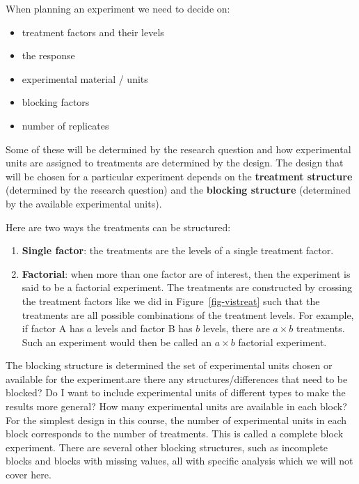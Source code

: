 \documentclass[
  letterpaper,
  DIV=11,
  numbers=noendperiod,
  oneside]{scrreprt}
\providecommand{\tightlist}{%
  \setlength{\itemsep}{0pt}\setlength{\parskip}{0pt}}\usepackage{longtable,booktabs,array}
\begin{document}
When planning an experiment we need to decide on:

\begin{itemize}
\tightlist
\item
  treatment factors and their levels
\item
  the response
\item
  experimental material / units
\item
  blocking factors
\item
  number of replicates
\end{itemize}

Some of these will be determined by the research question and how
experimental units are assigned to treatments are determined by the
design. The design that will be chosen for a particular experiment
depends on the \textbf{treatment structure} (determined by the research
question) and the \textbf{blocking structure} (determined by the
available experimental units).

Here are two ways the treatments can be structured:

\begin{enumerate}
\def\labelenumi{\arabic{enumi}.}
\tightlist
\item
  \textbf{Single factor}: the treatments are the levels of a single
  treatment factor.
\item
  \textbf{Factorial}: when more than one factor are of interest, then
  the experiment is said to be a factorial experiment. The treatments
  are constructed by crossing the treatment factors like we did in
  Figure~\ref{fig-vistreat} such that the treatments are all possible
  combinations of the treatment levels. For example, if factor A has
  \(a\) levels and factor B has \(b\) levels, there are \(a \times b\)
  treatments. Such an experiment would then be called an \(a \times b\)
  factorial experiment.
\end{enumerate}

The blocking structure is determined the set of experimental units
chosen or available for the experiment.are there any
structures/differences that need to be blocked? Do I want to include
experimental units of different types to make the results more general?
How many experimental units are available in each block? For the
simplest design in this course, the number of experimental units in each
block corresponds to the number of treatments. This is called a complete
block experiment. There are several other blocking structures, such as
incomplete blocks and blocks with missing values, all with specific
analysis which we will not cover here.
\end{document}
